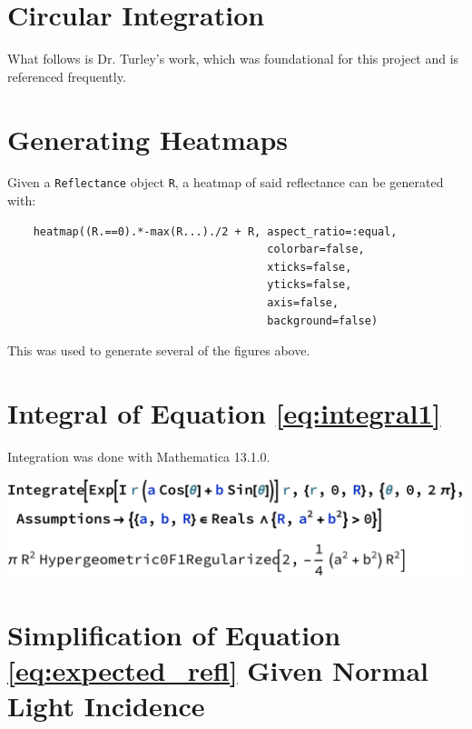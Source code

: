 \documentclass[etd,twoside,senior,noacknowledgments]{BYUPhys}
\begin{document}
\begin{appendices}

  \chapter{Circular Integration}\label{chap:circular_integration}
  
  What follows is Dr. Turley's work, which was foundational for this project and is referenced frequently.
  
  
  
  
  
  \chapter{Generating Heatmaps}\label{chap:heatmap_code}
  
  Given a \texttt{Reflectance} object \texttt{R}, a heatmap of said reflectance can be generated with:
  
  \begin{verbatim}
    heatmap((R.==0).*-max(R...)./2 + R, aspect_ratio=:equal,
                                        colorbar=false,
                                        xticks=false,
                                        yticks=false,
                                        axis=false,
                                        background=false)
  \end{verbatim}
  
  This was used to generate several of the figures above.
  
  
  
  \chapter{Integral of Equation \ref{eq:integral1}}\label{chap:integral}
  
  Integration was done with Mathematica 13.1.0.
  
  \includegraphics[width=\textwidth]{nasty-integral.pdf}
  
  
  
  \chapter{Simplification of Equation \ref{eq:expected_refl} Given Normal Light Incidence}\label{chap:airy_validation}
  

\end{appendices}
\end{document}
